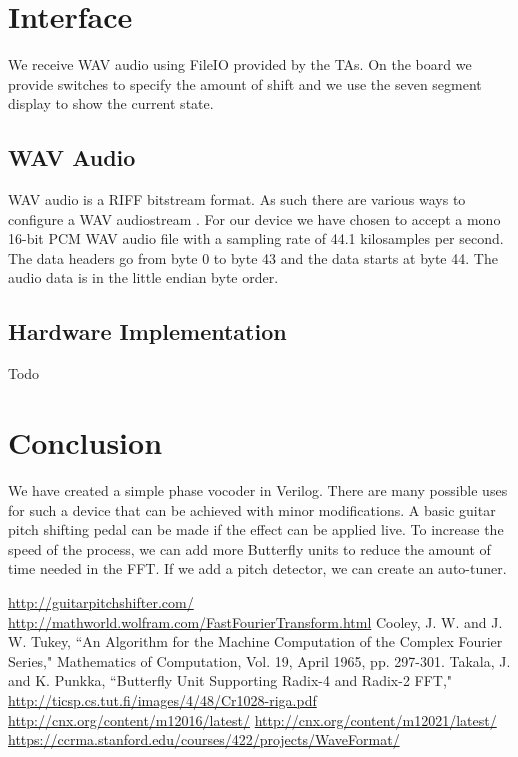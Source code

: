 \documentclass[twoside]{article}
\begin{document}
%
%
%
%
\section{Interface}
  We receive WAV audio using FileIO provided by the TAs. On the board we provide switches to specify the amount of shift
  and we use the seven segment display to show the current state.
  
  \subsection{WAV Audio}
  WAV audio is a RIFF bitstream format.  As such there are various ways to configure a WAV audiostream \cite{bib:wav}. 
  For our device we have chosen to accept a mono 16-bit PCM WAV audio file with a sampling rate of 44.1 kilosamples per second.
  The data headers go from byte 0 to byte 43 and the data starts at byte 44.  The audio data is in the little endian byte order.
  
  \subsection{Hardware Implementation}
  Todo


%
\section{Conclusion}
We have created a simple phase vocoder in Verilog. There are many possible uses for such a device that can be achieved
with minor modifications. A basic guitar pitch shifting pedal can be made if the effect can be applied live. 
To increase the speed of the process, we can add more Butterfly units to reduce the amount of time needed in the FFT.  
If we add a pitch detector, we can create an auto-tuner. 


\begin{thebibliography}{10}
 \url{http://guitarpitchshifter.com/}
 \url{http://mathworld.wolfram.com/FastFourierTransform.html}
 	Cooley, J. W. and J. W. Tukey, ``An Algorithm for the Machine Computation of the Complex Fourier Series," Mathematics of Computation, Vol. 19, April 1965, pp. 297-301.
 Takala, J. and K. Punkka, ``Butterfly Unit Supporting Radix-4 and Radix-2 FFT," \url{http://ticsp.cs.tut.fi/images/4/48/Cr1028-riga.pdf}
 \url{http://cnx.org/content/m12016/latest/}
 \url{http://cnx.org/content/m12021/latest/}
 \url{https://ccrma.stanford.edu/courses/422/projects/WaveFormat/}
\end{thebibliography}
\end{document}

